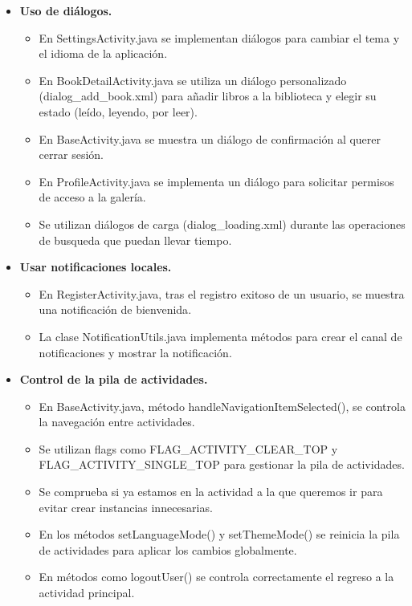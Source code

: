 \documentclass[a4paper,10pt]{report}
\begin{document}
\begin{itemize}
        \item \textbf{Uso de diálogos.}
        \begin{itemize}
          \item En SettingsActivity.java se implementan diálogos para cambiar el tema y el idioma de la aplicación.
          \item En BookDetailActivity.java se utiliza un diálogo personalizado (dialog\_add\_book.xml) para añadir libros a la biblioteca y elegir su estado (leído, leyendo, por leer).
          \item En BaseActivity.java se muestra un diálogo de confirmación al querer cerrar sesión.
          \item En ProfileActivity.java se implementa un diálogo para solicitar permisos de acceso a la galería.
          \item Se utilizan diálogos de carga (dialog\_loading.xml) durante las operaciones de busqueda que puedan llevar tiempo.
        \end{itemize}
        \item \textbf{Usar notificaciones locales.}
        \begin{itemize}
          \item En RegisterActivity.java, tras el registro exitoso de un usuario, se muestra una notificación de bienvenida\cite{android_notifications}.
          \item La clase NotificationUtils.java implementa métodos para crear el canal de notificaciones y mostrar la notificación.
        \end{itemize}
        \item \textbf{Control de la pila de actividades.}
        \begin{itemize}
          \item En BaseActivity.java, método handleNavigationItemSelected(), se controla la navegación entre actividades.
          \item Se utilizan flags como FLAG\_ACTIVITY\_CLEAR\_TOP y FLAG\_ACTIVITY\_SINGLE\_TOP para gestionar la pila de actividades.
          \item Se comprueba si ya estamos en la actividad a la que queremos ir para evitar crear instancias innecesarias.
          \item En los métodos setLanguageMode() y setThemeMode() se reinicia la pila de actividades para aplicar los cambios globalmente.
          \item En métodos como logoutUser() se controla correctamente el regreso a la actividad principal.
          \end{itemize}
      \end{itemize}
\end{document}
